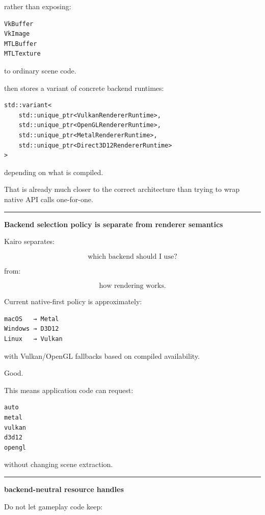 rather than exposing:

\begin{verbatim}
VkBuffer
VkImage
MTLBuffer
MTLTexture
\end{verbatim}

to ordinary scene code.

 then stores a variant of concrete backend runtimes:

\begin{verbatim}
std::variant<
    std::unique_ptr<VulkanRendererRuntime>,
    std::unique_ptr<OpenGLRendererRuntime>,
    std::unique_ptr<MetalRendererRuntime>,
    std::unique_ptr<Direct3D12RendererRuntime>
>
\end{verbatim}

depending on what is compiled.

That is already much closer to the correct architecture than trying to wrap native API calls one-for-one.

\begin{center}\rule{0.5\linewidth}{0.5pt}\end{center}

\textbf{Backend selection policy is separate from renderer semantics}

Kairo separates:

\[
\text{which backend should I use?}
\]

from:

\[
\text{how rendering works}.
\]

Current native-first policy is approximately:

\begin{verbatim}
macOS   → Metal
Windows → D3D12
Linux   → Vulkan
\end{verbatim}

with Vulkan/OpenGL fallbacks based on compiled availability.

Good.

This means application code can request:

\begin{verbatim}
auto
metal
vulkan
d3d12
opengl
\end{verbatim}

without changing scene extraction.

\begin{center}\rule{0.5\linewidth}{0.5pt}\end{center}

\textbf{backend-neutral resource handles}

Do not let gameplay code keep:

